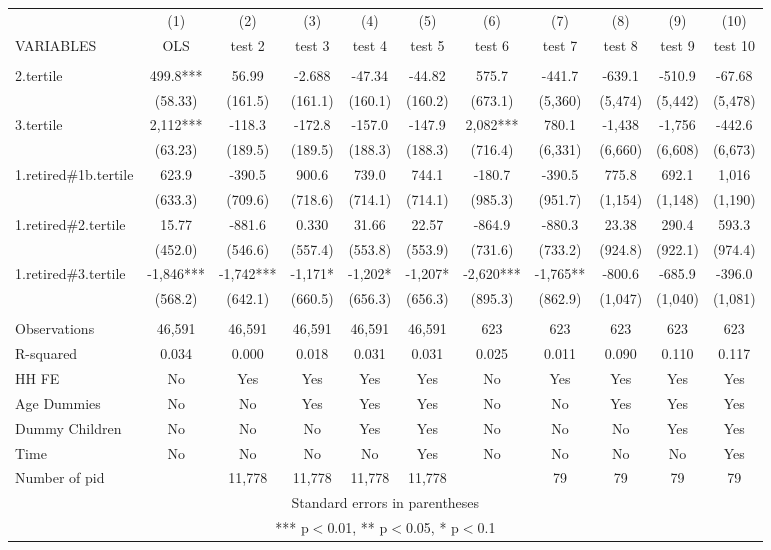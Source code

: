 \begin{tabular}{lcccccccccc} \hline
 & (1) & (2) & (3) & (4) & (5) & (6) & (7) & (8) & (9) & (10) \\
VARIABLES & OLS & test 2 & test 3 & test 4 & test 5 & test 6 & test 7 & test 8 & test 9 & test 10 \\ \hline
 &  &  &  &  &  &  &  &  &  &  \\
2.tertile & 499.8*** & 56.99 & -2.688 & -47.34 & -44.82 & 575.7 & -441.7 & -639.1 & -510.9 & -67.68 \\
 & (58.33) & (161.5) & (161.1) & (160.1) & (160.2) & (673.1) & (5,360) & (5,474) & (5,442) & (5,478) \\
3.tertile & 2,112*** & -118.3 & -172.8 & -157.0 & -147.9 & 2,082*** & 780.1 & -1,438 & -1,756 & -442.6 \\
 & (63.23) & (189.5) & (189.5) & (188.3) & (188.3) & (716.4) & (6,331) & (6,660) & (6,608) & (6,673) \\
1.retired\#1b.tertile & 623.9 & -390.5 & 900.6 & 739.0 & 744.1 & -180.7 & -390.5 & 775.8 & 692.1 & 1,016 \\
 & (633.3) & (709.6) & (718.6) & (714.1) & (714.1) & (985.3) & (951.7) & (1,154) & (1,148) & (1,190) \\
1.retired\#2.tertile & 15.77 & -881.6 & 0.330 & 31.66 & 22.57 & -864.9 & -880.3 & 23.38 & 290.4 & 593.3 \\
 & (452.0) & (546.6) & (557.4) & (553.8) & (553.9) & (731.6) & (733.2) & (924.8) & (922.1) & (974.4) \\
1.retired\#3.tertile & -1,846*** & -1,742*** & -1,171* & -1,202* & -1,207* & -2,620*** & -1,765** & -800.6 & -685.9 & -396.0 \\
 & (568.2) & (642.1) & (660.5) & (656.3) & (656.3) & (895.3) & (862.9) & (1,047) & (1,040) & (1,081) \\
 &  &  &  &  &  &  &  &  &  &  \\
Observations & 46,591 & 46,591 & 46,591 & 46,591 & 46,591 & 623 & 623 & 623 & 623 & 623 \\
R-squared & 0.034 & 0.000 & 0.018 & 0.031 & 0.031 & 0.025 & 0.011 & 0.090 & 0.110 & 0.117 \\
HH FE & No & Yes & Yes & Yes & Yes & No & Yes & Yes & Yes & Yes \\
Age Dummies & No & No & Yes & Yes & Yes & No & No & Yes & Yes & Yes \\
Dummy Children & No & No & No & Yes & Yes & No & No & No & Yes & Yes \\
Time & No & No & No & No & Yes & No & No & No & No & Yes \\
 Number of pid &  & 11,778 & 11,778 & 11,778 & 11,778 &  & 79 & 79 & 79 & 79 \\ \hline
\multicolumn{11}{c}{ Standard errors in parentheses} \\
\multicolumn{11}{c}{ *** p$<$0.01, ** p$<$0.05, * p$<$0.1} \\
\end{tabular}
